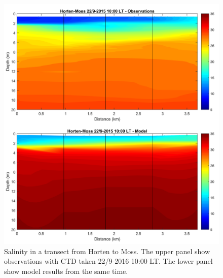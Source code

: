 \documentclass[12pt,a4paper,english]{article}
\begin{document}
\begin{figure}[ht]
\centerline{
\includegraphics*[width=\textwidth]{Figurer/Transect_P_salt.png}}
\caption{\small
Salinity in a transect from Horten to Moss. 
The upper panel show observations with CTD taken
22/9-2016 10:00 LT. The lower panel show model results from the same time.}
\label{fig:CTD_Mod_P}
\end{figure}
\end{document}
